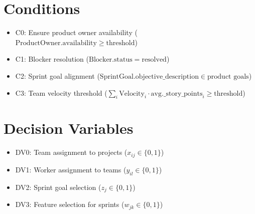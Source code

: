 \documentclass{article}
\begin{document}
\section{Conditions}
\begin{itemize}
    \item C0: Ensure product owner availability ($\text{ProductOwner}.\text{availability} \geq \text{threshold}$)
    \item C1: Blocker resolution ($\text{Blocker}.\text{status} = \text{resolved}$)
    \item C2: Sprint goal alignment ($\text{SprintGoal}.\text{objective\_description} \in \text{product goals}$)
    \item C3: Team velocity threshold ($\sum_{i} \text{Velocity}_{i} \cdot \text{avg.\_story\_points}_{i} \geq \text{threshold}$)
\end{itemize}

\section{Decision Variables}
\begin{itemize}
    \item DV0: Team assignment to projects ($x_{ij} \in \{0,1\}$)
    \item DV1: Worker assignment to teams ($y_{il} \in \{0,1\}$)
    \item DV2: Sprint goal selection ($z_{j} \in \{0,1\}$)
    \item DV3: Feature selection for sprints ($w_{jk} \in \{0,1\}$)
\end{itemize}
\end{document}
